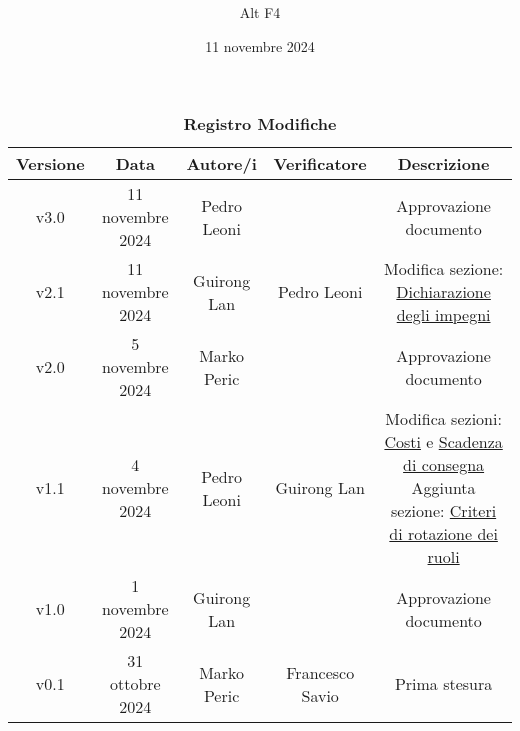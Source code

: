 \documentclass[a4paper, 12pt]{article}
\title{\Huge \textbf{\titolo}}
\author{\Large{Alt} \raisebox{0.3ex}{\normalsize  +} \Large{F4}}
\date{11 novembre 2024}
\def\logo{../Immagini/logo.jpeg}
\def\ultima-versione{v3.0}
\begin{document}
\begin{titlepage}      
    \maketitle
    \thispagestyle{empty}  

\end{titlepage}

\thispagestyle{plain}
\begin{table}[H]
    \centering
    \caption*{\textbf{\Large Registro Modifiche}}
    {\renewcommand{\arraystretch}{2}
    \begin{tabularx}{\textwidth}{| c | c | C | C | C |}
        \hline
            \textbf{\normalsize Versione} & 
            \textbf{\normalsize Data} & 
            \textbf{\normalsize Autore/i} & 
            \textbf{\normalsize Verificatore} &
            \textbf{\normalsize Descrizione} \\ 
        \hline \hline
        \ultima-versione & 
        11 novembre 2024& 
        Pedro Leoni &
        & 
        Approvazione documento\\
        \hline
        v2.1 & 
        11 novembre 2024& 
        Guirong Lan &
        Pedro Leoni& 
        Modifica sezione:  \hyperref[sec:dic]{Dichiarazione degli impegni}\\
        \hline
        v2.0 & 
        5 novembre 2024& 
        Marko Peric &
        & 
        Approvazione documento \\
        \hline
        v1.1 &
        4 novembre 2024 &
        Pedro Leoni &
        Guirong Lan&
        Modifica sezioni: \hyperref[sec:cost]{Costi} e \hyperref[sec:scad]{Scadenza di consegna}
        Aggiunta sezione: \hyperref[sec:crit]{Criteri di rotazione dei ruoli} \\
        \hline
        v1.0 & 
        1 novembre 2024& 
        Guirong Lan &
        & 
        Approvazione documento \\
        \hline 
        v0.1 &
        31 ottobre 2024 & 
        Marko Peric &
        Francesco Savio &
        Prima stesura \\
        \hline
    \end{tabularx}}
\end{table}
\restoregeometry
\end{document}

